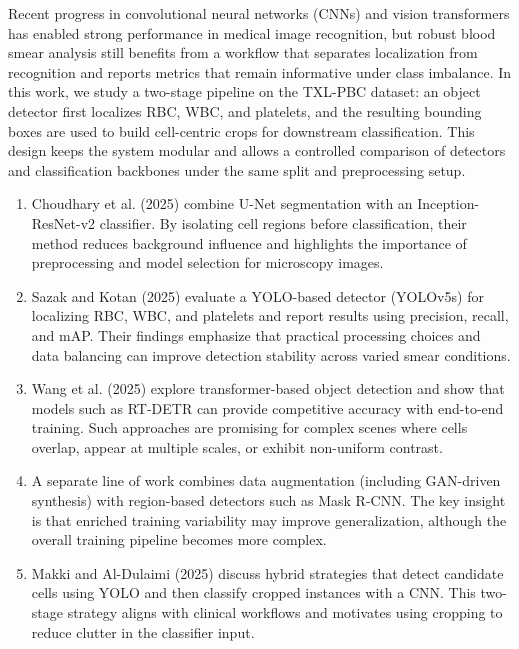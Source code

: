 \documentclass[conference]{IEEEtran}
\begin{document}
Recent progress in convolutional neural networks (CNNs) and vision transformers has enabled strong performance in medical image recognition, but robust blood smear analysis still benefits from a workflow that separates localization from recognition and reports metrics that remain informative under class imbalance. In this work, we study a two-stage pipeline on the TXL-PBC dataset: an object detector first localizes RBC, WBC, and platelets, and the resulting bounding boxes are used to build cell-centric crops for downstream classification. This design keeps the system modular and allows a controlled comparison of detectors and classification backbones under the same split and preprocessing setup.

\begin{enumerate}
    \item Choudhary et al. (2025) combine U-Net segmentation with an Inception-ResNet-v2 classifier. By isolating cell regions before classification, their method reduces background influence and highlights the importance of preprocessing and model selection for microscopy images.
    
    \item Sazak and Kotan (2025) evaluate a YOLO-based detector (YOLOv5s) for localizing RBC, WBC, and platelets and report results using precision, recall, and mAP. Their findings emphasize that practical processing choices and data balancing can improve detection stability across varied smear conditions.
    
    \item Wang et al. (2025) explore transformer-based object detection and show that models such as RT-DETR can provide competitive accuracy with end-to-end training. Such approaches are promising for complex scenes where cells overlap, appear at multiple scales, or exhibit non-uniform contrast.
    
    \item A separate line of work combines data augmentation (including GAN-driven synthesis) with region-based detectors such as Mask R-CNN. The key insight is that enriched training variability may improve generalization, although the overall training pipeline becomes more complex.
    
    \item Makki and Al-Dulaimi (2025) discuss hybrid strategies that detect candidate cells using YOLO and then classify cropped instances with a CNN. This two-stage strategy aligns with clinical workflows and motivates using cropping to reduce clutter in the classifier input.
\end{enumerate}
\end{document}
